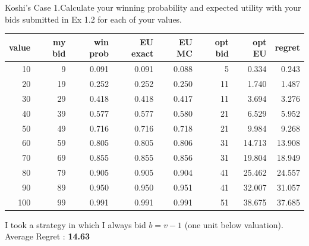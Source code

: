 \documentclass{beamer}
\begin{document}
\begin{frame}{Koshi's Case}
1.Calculate your winning probability and expected utility with your bids submitted in Ex 1.2 for each of your values.
\begin{center}
\small
\begin{tabular}{@{}rrrrrrrr@{}}
\toprule
value & my bid & win prob & EU exact & EU MC & opt bid & opt EU & regret \\
\midrule
 10 &   9 & 0.091 & 0.091 & 0.088 &  5 & 0.334 & 0.243 \\
 20 &  19 & 0.252 & 0.252 & 0.250 & 11 & 1.740 & 1.487 \\
 30 &  29 & 0.418 & 0.418 & 0.417 & 11 & 3.694 & 3.276 \\
 40 &  39 & 0.577 & 0.577 & 0.580 & 21 & 6.529 & 5.952 \\
 50 &  49 & 0.716 & 0.716 & 0.718 & 21 & 9.984 & 9.268 \\
 60 &  59 & 0.805 & 0.805 & 0.806 & 31 &14.713 &13.908 \\
 70 &  69 & 0.855 & 0.855 & 0.856 & 31 &19.804 &18.949 \\
 80 &  79 & 0.905 & 0.905 & 0.904 & 41 &25.462 &24.557 \\
 90 &  89 & 0.950 & 0.950 & 0.951 & 41 &32.007 &31.057 \\
100 &  99 & 0.991 & 0.991 & 0.991 & 51 &38.675 &37.685 \\
\bottomrule
\end{tabular}
\end{center}
I took a strategy in which I always bid \(b=v-1\) (one unit below valuation).
Average Regret : \textbf{14.63}
\end{frame}
\end{document}
